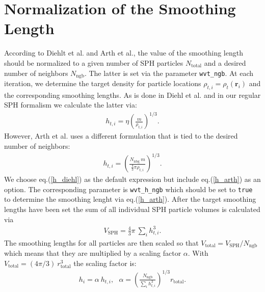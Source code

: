 \documentclass{article}
\begin{document}
\section{Normalization of the Smoothing Length}
According to Diehlt et al. and Arth et al., the value of the smoothing length should be normalized to a given number of SPH particles $N_\mathrm{total}$ and a desired number of neighbors $N_\mathrm{ngb}$.
The latter is set via the parameter \texttt{wvt\_ngb}. 
At each iteration, we determine the target density for particle locations $\rho_{t,i} = \rho_t (\mathbf{r}_i)$ and the corresponding smoothing lengths. 
As is done in Diehl et al. \cite{Diehl15} and in our regular SPH formalism we calculate the latter via:
\begin{align}
h_{t,i} = \eta \left(\frac{m}{\rho_{t,i}}\right)^{1/3}.
\label{h_diehl}
\end{align}
However, Arth et al. uses a different formulation that is tied to the desired number of neighbors:
\begin{align}
h_{t,i} = \left( \frac{N_\mathrm{nbg} \: m}{\frac{4}{3} \pi \rho_{t,i}} \right)^{1/3} .
\label{h_arth}
\end{align}
We choose eq.(\ref{h_diehl}) as the default expression but include eq.(\ref{h_arth}) as an option. 
The corresponding parameter is \texttt{wvt\_h\_ngb} which should be set to \texttt{true} to determine the smoothing lenght via eq.(\ref{h_arth}). 
After the target smoothing lengths have been set the sum of all individual SPH particle volumes is calculated via
\begin{align}
V_\mathrm{SPH} = \frac{4}{3} \pi \: \sum_i h_{t,i}^3 .
\end{align}
The smoothing lengths for all particles are then scaled so that $V_\mathrm{total} = V_\mathrm{SPH} / N_\mathrm{ngb}$ which means that they are multiplied by a scaling factor $\alpha$.
With $V_\mathrm{total} = (4 \pi/3) \: r_\mathrm{total}^3$ the scaling factor is:
\begin{align}
h_i = \alpha \: h_{t,i}, \:\:\: \alpha =  \left( \frac{N_\mathrm{ngb}}{\sum_i h_{t,i}^3} \right)^{1/3} r_\mathrm{total}.
\end{align}
\end{document}
